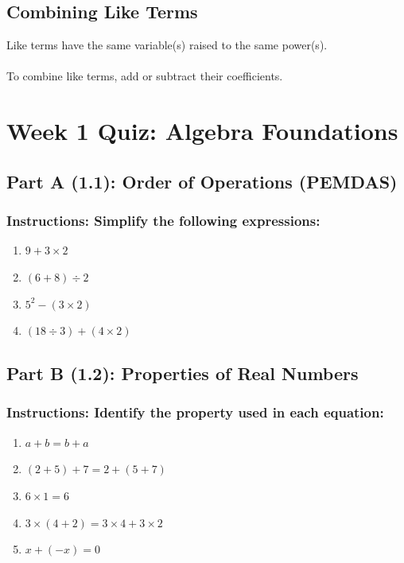 \documentclass[12pt]{article}
\begin{document}
	    \subsection*{Combining Like Terms}
        	Like terms have the same variable(s) raised to the same power(s).\\\\
            To combine like terms, add or subtract their coefficients.

            \newpage

    \section*{Week 1 Quiz: Algebra Foundations}
	
        \subsection*{Part A (1.1): Order of Operations (PEMDAS)}
            
            \subsubsection*{Instructions: Simplify the following expressions:}

                \begin{enumerate}
                    \item $9 + 3 \times 2$
                    \item $(6 + 8) \div 2$
                    \item $5^2 - (3 \times 2)$
                    \item $(18 \div 3) + (4 \times 2)$
                \end{enumerate}
        
        \subsection*{Part B (1.2): Properties of Real Numbers}
            
            \subsubsection*{Instructions: Identify the property used in each equation:}

                \begin{enumerate}
                    \item $a + b = b + a$
                    \item $(2 + 5) + 7 = 2 + (5 + 7)$
                    \item $6 \times 1 = 6$
                    \item $3 \times (4 + 2) = 3 \times 4 + 3 \times 2$
                    \item $x + (-x) = 0$
                \end{enumerate}
        
\end{document}
